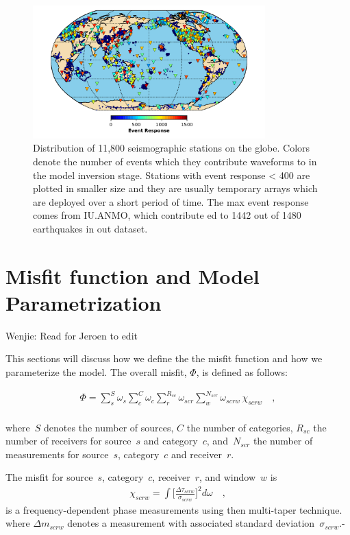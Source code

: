 \documentclass[extra,mreferee]{gji}
\begin{document}
\begin{figure}
  \includegraphics[width=0.8\textwidth]{figures/station_map.pdf}
  \caption{Distribution of 11,800 seismographic stations on the globe. Colors denote the number of events which they contribute waveforms to in the model inversion stage. Stations with event response < 400 are plotted in smaller size and they are usually temporary arrays which are deployed over a short period of time. The max event response comes from IU.ANMO, which contribute ed to 1442 out of 1480 earthquakes in out dataset.}
  \label{fig:stations}
  \centering
\end{figure}

\section{Misfit function and Model Parametrization}

{\color{Red} Wenjie: Read for Jeroen to edit}

This sections will discuss how we define the the misfit function and how we parameterize the model.
The overall misfit, $\Phi$, is defined as follows:

\begin{align}
\label{eq:misfit}
\Phi = \sum_{s}^{S} \omega_s \sum_{c}^{C} \omega_{c} \sum_{r}^{R_{sc}} \omega_{scr} \sum_{w}^{N_{scr}} \omega_{scrw}\, \chi_{scrw}
\quad ,
\end{align}\\
where~$S$ denotes the number of sources, $C$ the number of categories,
$R_{sc}$ the number of receivers for source~$s$ and category~$c$,
and~$N_{scr}$ the number of measurements for source~$s$, category~$c$
and receiver~$r$.

The misfit for source~$s$, category~$c$, receiver~$r$, and window~$w$ is
\begin{align}
  \chi_{scrw} = \int \Big[ \frac {\Delta \tau_{scrw}} {\sigma_{scrw}} \Big]^2 d\omega
\quad ,
\end{align}
is a frequency-dependent phase measurements using then multi-taper technique.
where $\Delta m_{scrw}$ denotes a measurement with associated standard deviation~$\sigma_{scrw}$.-
\end{document}
